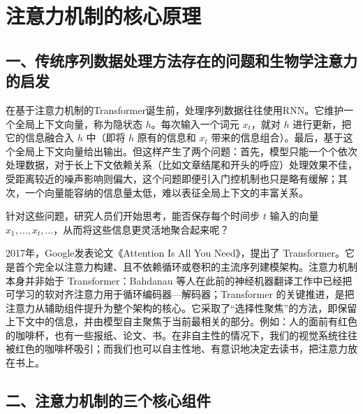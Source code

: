 \setcounter{section}{0}

\hypertarget{ux6ce8ux610fux529bux673aux5236ux7684ux6838ux5fc3ux539fux7406}{%
\section{注意力机制的核心原理}\label{ux6ce8ux610fux529bux673aux5236ux7684ux6838ux5fc3ux539fux7406}}

\hypertarget{ux4e00ux4f20ux7edfux5e8fux5217ux6570ux636eux5904ux7406ux65b9ux6cd5ux5b58ux5728ux7684ux95eeux9898ux548cux751fux7269ux5b66ux6ce8ux610fux529bux7684ux542fux53d1}{%
\subsection{一、传统序列数据处理方法存在的问题和生物学注意力的启发}\label{ux4e00ux4f20ux7edfux5e8fux5217ux6570ux636eux5904ux7406ux65b9ux6cd5ux5b58ux5728ux7684ux95eeux9898ux548cux751fux7269ux5b66ux6ce8ux610fux529bux7684ux542fux53d1}}

在基于注意力机制的Transformer诞生前，处理序列数据往往使用RNN。它维护一个全局上下文向量，称为隐状态 \(h\)。每次输入一个词元 \(x_t\)，就对 \(h\) 进行更新，把它的信息融合入 \(h\) 中（即将 \(h\) 原有的信息和 \(x_t\) 带来的信息组合）。最后，基于这个全局上下文向量给出输出。但这样产生了两个问题：首先，模型只能一个个依次处理数据，对于长上下文依赖关系（比如文章结尾和开头的呼应）处理效果不佳，受距离较近的噪声影响则偏大，这个问题即便引入门控机制也只是略有缓解；其次，一个向量能容纳的信息量太低，难以表征全局上下文的丰富关系。

针对这些问题，研究人员们开始思考，能否保存每个时间步 \(t\) 输入的向量 \(x_1,\ldots,x_t,\ldots\)，从而将这些信息更灵活地聚合起来呢？

2017年，Google发表论文《Attention Is All You Need》，提出了 Transformer。它是首个完全以注意力构建、且不依赖循环或卷积的主流序列建模架构。注意力机制本身并非始于 Transformer：Bahdanau 等人在此前的神经机器翻译工作中已经把可学习的软对齐注意力用于循环编码器---解码器；Transformer 的关键推进，是把注意力从辅助组件提升为整个架构的核心。它采取了``选择性聚焦''的方法，即保留上下文中的信息，并由模型自主聚焦于当前最相关的部分。例如：人的面前有红色的咖啡杯，也有一些报纸、论文、书。在非自主性的情况下，我们的视觉系统往往被红色的咖啡杯吸引；而我们也可以自主性地、有意识地决定去读书，把注意力放在书上。

\hypertarget{ux4e8cux6ce8ux610fux529bux673aux5236ux7684ux4e09ux4e2aux6838ux5fc3ux7ec4ux4ef6}{%
\subsection{二、注意力机制的三个核心组件}\label{ux4e8cux6ce8ux610fux529bux673aux5236ux7684ux4e09ux4e2aux6838ux5fc3ux7ec4ux4ef6}}

